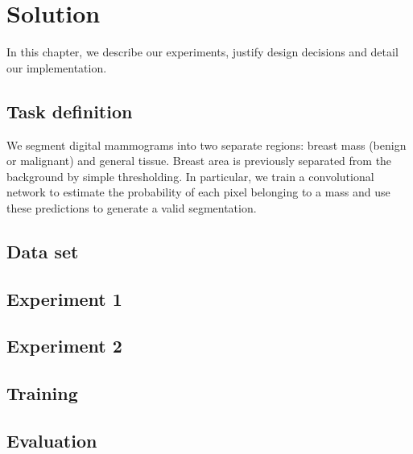\chapter{Solution}
\label{ch:Model}

In this chapter, we describe our experiments, justify design decisions and detail our implementation.


\section{Task definition}
We segment digital mammograms into two separate regions: breast mass (benign or malignant) and general tissue.
Breast area is previously separated from the background by simple thresholding.
In particular, we train a convolutional network to estimate the probability of each pixel belonging to a mass and use these predictions to generate a valid segmentation.

\section{Data set}


\section{Experiment 1}
\label{sec:Experiment1}


\section{Experiment 2}
\label{sec:Experiment2}


\begin{comment}
\section{Experiment 3}
\label{sec:Experiment3}
We use a different netwrok architecture and insights gained from previous experiments to improve our results. 

\subsection{Architecture}
An architecture modelled on the ResNet~\cite{}, winner of the 2015 ImageNet competition is also used for experiments (Tab~\cite{}).
\end{comment}

\section{Training}


\section{Evaluation}

